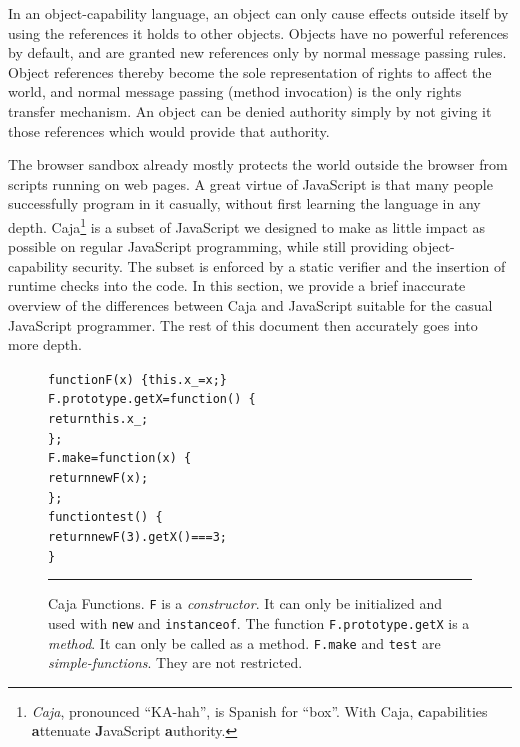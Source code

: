 \documentclass[letterpaper,twocolumn,10pt]{article}
\newcommand{\code}[1]{{\tt {#1}}}              %
\begin{document}
In an object-capability language, an object can only cause effects outside 
itself by using the references it holds to other objects. Objects have no 
powerful references by default, and are granted new references only by normal 
message passing rules. Object references thereby become the sole 
representation of rights to affect the world, and normal message passing 
(method invocation) is 
the only rights transfer mechanism. An object can be denied authority simply 
by not giving it those references which would provide that authority.

The browser sandbox already mostly protects the world outside the browser 
from scripts running on web pages. A great virtue of JavaScript is that many 
people successfully program in it casually, without first learning the 
language in any depth. Caja\footnote{
%
\emph{Caja}, pronounced ``KA-hah'', is Spanish for ``box''. With Caja, 
\textbf{c}apabilities \textbf{a}ttenuate \textbf{J}avaScript 
\textbf{a}uthority.
%
} is a subset of JavaScript we designed to make as little impact as 
possible on regular JavaScript programming, while still providing 
object-capability security.  The subset is enforced by a static verifier
and the insertion of runtime checks into the code.  In this section, we provide a brief inaccurate 
overview of the differences between Caja and JavaScript suitable for the 
casual JavaScript programmer. The rest of this document then accurately goes 
into more depth.

\begin{figure}[t!]
\begin{alltt}
function F(x)\ \{ this.x_ = x; \}
F.prototype.getX = function()\ \{
  return this.x_;
\};
F.make = function(x)\ \{
  return new F(x);
\};
function test()\ \{
  return new F(3).getX() === 3;
\}
\end{alltt}

\caption[Caja Functions]{Caja Functions. \code{F} is a \emph{constructor}. It 
can only be initialized and used with \code{new} and \code{instanceof}. 
The function \code{F.prototype.getX} is a \emph{method}. It can only be called as a 
method. \code{F.make} and \code{test} are \emph{simple-functions}. They are
not restricted. \\ } \hrule
\label{fig:func-obj}
\end{figure}
\end{document}
